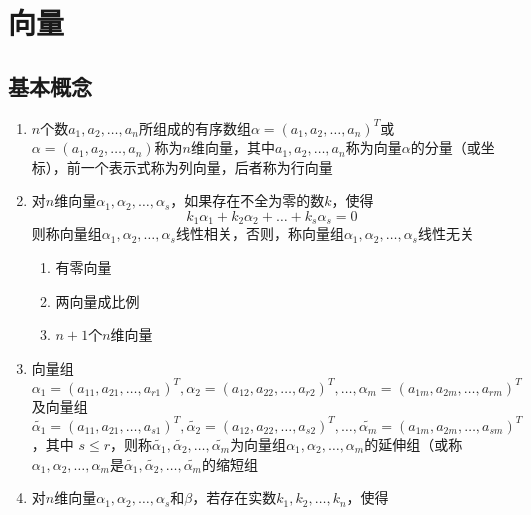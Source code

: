 \documentclass[a4paper,12pt]{article}
\begin{document}


    \section{向量}

    \subsection{基本概念}

    \begin{enumerate}
        \item $n$个数$a_1, a_2, \dots, a_n$所组成的有序数组$\alpha = (a_1, a_2, \dots, a_n)^T$或$\alpha = (a_1, a_2, \dots, a_n)$称为$n$维向量，其中$a_1, a_2, \dots, a_n$称为向量$\alpha$的分量（或坐标），前一个表示式称为列向量，后者称为行向量
        \item 对$n$维向量$\alpha_1, \alpha_2, \dots, \alpha_s$，如果存在不全为零的数$k$，使得
        \[
            k_{1}\alpha_1 + k_{2}\alpha_2 + \dots + k_{s}\alpha_s = 0
        \]
        则称向量组$\alpha_1, \alpha_2, \dots, \alpha_s$线性相关，否则，称向量组$\alpha_1, \alpha_2, \dots, \alpha_s$线性无关
        \begin{enumerate}
            \item 有零向量
            \item 两向量成比例
            \item $n+1$个$n$维向量
        \end{enumerate}
        \item 向量组$\alpha_1 = (a_{11}, a_{21}, \dots, a_{r1})^T, \alpha_2 = (a_{12}, a_{22}, \dots, a_{r2})^T, \dots, \alpha_m = (a_{1m}, a_{2m}, \dots, a_{rm})^T$及向量组$\widetilde{\alpha_1} = (a_{11}, a_{21}, \dots, a_{s1})^T, \widetilde{\alpha_2} = (a_{12}, a_{22}, \dots, a_{s2})^T, \dots, \widetilde{\alpha_m} = (a_{1m}, a_{2m}, \dots, a_{sm})^T$，其中 $s \le r$，则称$\widetilde{\alpha_1}, \widetilde{\alpha_2}, \dots, \widetilde{\alpha_m}$为向量组$\alpha_1, \alpha_2, \dots, \alpha_m$的延伸组（或称$\alpha_1, \alpha_2, \dots, \alpha_m$是$\widetilde{\alpha_1}, \widetilde{\alpha_2}, \dots, \widetilde{\alpha_m}$的缩短组
        \item 对$n$维向量$\alpha_1, \alpha_2, \dots, \alpha_s$和$\beta$，若存在实数$k_1, k_2, \dots, k_n$，使得

\end{enumerate}
\end{document}
